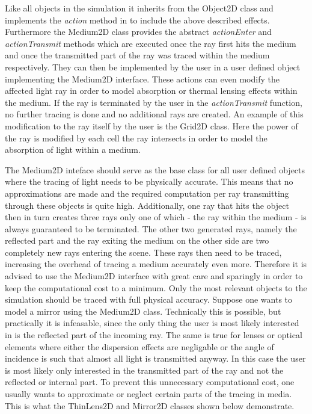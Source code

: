 \documentclass[a4paper,10pt]{article}
\begin{document}
    Like all objects in the simulation it inherits from the 
    Object2D class and implements the \emph{action} method in to
    include the above described effects.
    Furthermore the Medium2D class provides the abstract \emph{actionEnter}
    and \emph{actionTransmit} methods which are executed
    once the ray first hits the medium and once the transmitted part
    of the ray was traced within the medium respectively.
    They can then be implemented by the user in a user defined object
    implementing the Medium2D interface.
    These actions can even modify the affected light ray in order
    to model absorption or thermal lensing effects within the medium.
    If the ray is terminated by the user in the \emph{actionTransmit}
    function, no further tracing is done and no additional rays
    are created.
    An example of this modification to the ray itself by the user
    is the Grid2D class.
    Here the power of the ray is modified by each cell the ray intersects 
    in order to model the absorption of light within a medium.

    The Medium2D inteface should serve as the base class for all
    user defined objects where the tracing of light needs to
    be physically accurate.
    This means that no approximations are made and the required
    computation per ray transmitting through these objects is quite
    high.
    Additionally, one ray that hits the object then in turn creates
    three rays only one of which - the ray within the medium - is always
    guaranteed to be terminated.
    The other two generated rays, namely the reflected part and the
    ray exiting the medium on the other side are two completely
    new rays entering the scene.
    These rays then need to be traced, increasing the overhead
    of tracing a medium accurately even more.
    Therefore it is advised to use the Medium2D interface with
    great care and sparingly in order to keep the computational
    cost to a minimum.
    Only the most relevant objects to the simulation should be
    traced with full physical accuracy.
    Suppose one wants to model a mirror using the Medium2D class.
    Technically this is possible, but practically it is infeasable,
    since the only thing the user is most likely interested in
    is the reflected part of the incoming ray.
    The same is true for lenses or optical elements where either
    the dispersion effects are negligable or the angle of
    incidence is such that almost all light is transmitted
    anyway.
    In this case the user is most likely only interested in the
    transmitted part of the ray and not the reflected or internal
    part.
    To prevent this unnecessary computational cost, one usually
    wants to approximate or neglect certain parts of the
    tracing in media.
    This is what the ThinLens2D and Mirror2D classes shown below
    demonstrate.
\end{document}
